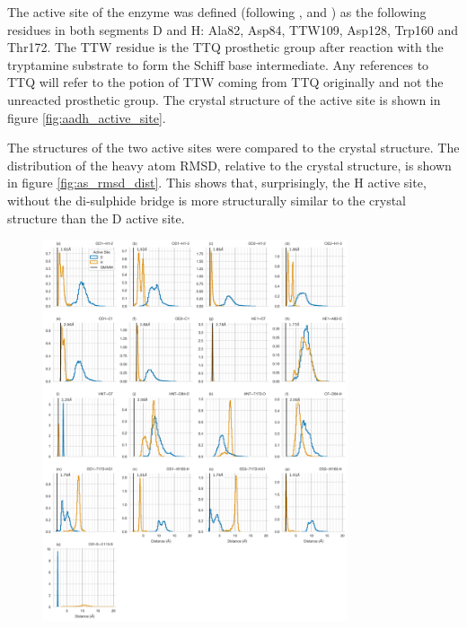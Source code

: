 The active site of the enzyme was defined (following \cite{ranaghanInitioQMMM2017}, \cite{masgrauAtomicDescriptionEnzyme2006} and \cite{masgrauTunnelingClassicalPaths2007}) as the following residues in both segments D and H: Ala82, Asp84, TTW109, Asp128, Trp160 and Thr172. The TTW residue is the TTQ prosthetic group after reaction with the tryptamine substrate to form the Schiff base intermediate. Any references to TTQ will refer to the potion of TTW coming from TTQ originally and not the unreacted prosthetic group. The crystal structure of the active site is shown in figure \ref{fig:aadh_active_site}. 

The structures of the two active sites were compared to the crystal structure. The distribution of the heavy atom RMSD, relative to the crystal structure, is shown in figure \ref{fig:as_rmsd_dist}. This shows that, surprisingly, the H active site, without the di-sulphide bridge is more structurally similar to the crystal structure than the D active site. 

\begin{figure}
    \centering
    \includegraphics[width=0.8\textwidth]{chapters/aadh/figures/bond_distances_dist.png}
    \label{fig:bond_dist}
\end{figure}

